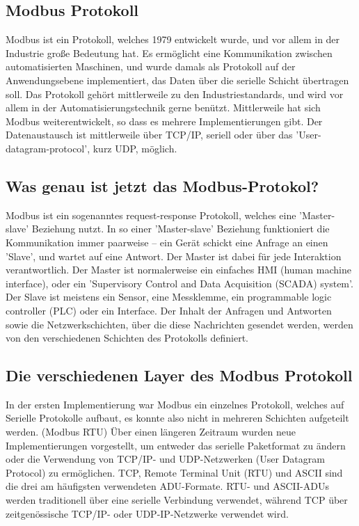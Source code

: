 \subsection{Modbus Protokoll}\label{modbusprotokoll} 

Modbus ist ein Protokoll, welches 1979 entwickelt wurde, und vor allem in der Industrie große Bedeutung hat. Es ermöglicht eine Kommunikation zwischen automatisierten Maschinen, und wurde damals als Protokoll auf der Anwendungsebene implementiert, das Daten über die serielle Schicht übertragen soll. Das Protokoll gehört mittlerweile zu den Industriestandards, und wird vor allem in der Automatisierungstechnik gerne benützt. Mittlerweile hat sich Modbus weiterentwickelt, so dass es mehrere Implementierungen gibt. Der Datenaustausch ist mittlerweile über TCP/IP, seriell oder über das 'User-datagram-protocol', kurz UDP, möglich.
\cite{ModbusgrundlagenKubunu} \cite{modbuskubunu}

\subsection{Was genau ist jetzt das Modbus-Protokol?}
Modbus ist ein sogenanntes request-response Protokoll, welches eine 'Master-slave' Beziehung nutzt. In so einer 'Master-slave' Beziehung funktioniert die Kommunikation immer paarweise – ein Gerät schickt eine Anfrage an einen 'Slave', und wartet auf eine Antwort. Der Master ist dabei für jede Interaktion verantwortlich. Der Master ist normalerweise ein einfaches HMI (human machine interface), oder ein 'Supervisory Control and Data Acquisition (SCADA) system'.  Der Slave ist meistens ein Sensor, eine Messklemme, ein programmable logic controller (PLC) oder ein Interface. Der Inhalt der Anfragen und Antworten sowie die Netzwerkschichten, über die diese Nachrichten gesendet werden, werden von den verschiedenen Schichten des Protokolls definiert. 
\cite{modbusoverserial}
\subsection{Die verschiedenen Layer des Modbus Protokoll }
In der ersten Implementierung war Modbus ein einzelnes Protokoll, welches auf Serielle Protokolle aufbaut, es konnte also nicht in mehreren Schichten aufgeteilt werden. (Modbus RTU) 
Über einen längeren Zeitraum wurden neue Implementierungen vorgestellt, um entweder das serielle Paketformat zu ändern oder die Verwendung von TCP/IP- und UDP-Netzwerken (User Datagram Protocol) zu ermöglichen. TCP, Remote Terminal Unit (RTU) und ASCII sind die drei am häufigsten verwendeten ADU-Formate. RTU- und ASCII-ADUs werden traditionell über eine serielle Verbindung verwendet, während TCP über zeitgenössische TCP/IP- oder UDP-IP-Netzwerke verwendet wird. 

